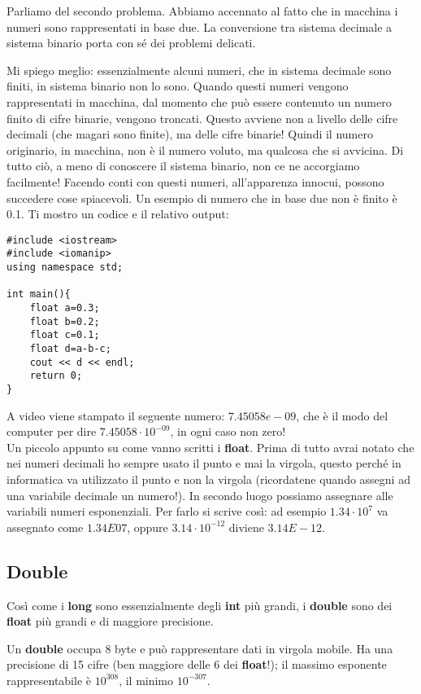 	Parliamo del secondo problema. Abbiamo accennato al fatto che in macchina i numeri sono rappresentati in base due. La conversione tra sistema decimale a sistema binario porta con sé dei problemi delicati. 
	
	Mi spiego meglio: essenzialmente alcuni numeri, che in sistema decimale sono finiti, in sistema binario non lo sono. Quando questi numeri vengono rappresentati in macchina, dal momento che può essere contenuto un numero finito di cifre binarie, vengono troncati. Questo avviene non a livello delle cifre decimali (che magari sono finite), ma delle cifre binarie! Quindi il numero originario, in macchina, non è il numero voluto, ma qualcosa che si avvicina. Di tutto ciò, a meno di conoscere il sistema binario, non ce ne accorgiamo facilmente! Facendo conti con questi numeri, all'apparenza innocui, possono succedere cose spiacevoli. Un esempio di numero che in base due non è finito è 0.1. Ti mostro un codice e il relativo output:
	\begin{lstlisting}
#include <iostream>
#include <iomanip>
using namespace std;

int main(){
	float a=0.3;
	float b=0.2;
	float c=0.1;
	float d=a-b-c;
	cout << d << endl;
	return 0;
}
	\end{lstlisting}
	A video viene stampato il seguente numero: $7.45058e-09$, che è il modo del computer per dire $7.45058\cdot10^{-09}$, in ogni caso non zero!
	\\
	
	Un piccolo appunto su come vanno scritti i \textbf{float}. Prima di tutto avrai notato che nei numeri decimali ho sempre usato il punto e mai la virgola, questo perché in informatica va utilizzato il punto e non la virgola (ricordatene quando assegni ad una variabile decimale un numero!). In secondo luogo possiamo assegnare alle variabili numeri esponenziali. Per farlo si scrive così: ad esempio $1.34\cdot10^{7}$ va assegnato come $1.34E07$, oppure $3.14\cdot10^{-12}$ diviene $3.14E-12$. 
	
	
	
	\subsection{Double}
	Così come i \textbf{long} sono essenzialmente degli \textbf{int} più grandi, i \textbf{double} sono dei \textbf{float} più grandi e di maggiore precisione.
	
	Un \textbf{double} occupa 8 byte e può rappresentare dati in virgola mobile. Ha una precisione di 15 cifre (ben maggiore delle 6 dei \textbf{float}!); il massimo esponente rappresentabile è $10^{308}$, il minimo $10^{-307}$.
	
